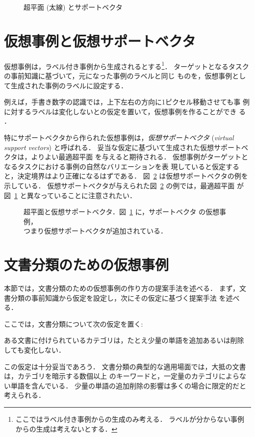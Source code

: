 \begin{figure}
\begin{center}
\end{center}
\caption{超平面 (太線) とサポートベクタ}\label{fig:sv}
\end{figure}


\section{仮想事例と仮想サポートベクタ}\label{sec:vsv}

仮想事例は，ラベル付き事例から生成されるとする\footnote{
ここではラベル付き事例からの生成のみ考える．
ラベルが分からない事例からの生成は考えないとする．
}．
ターゲットとなるタスクの事前知識に基づいて，元になった事例のラベルと同じ
ものを，仮想事例として生成された事例のラベルに設定する．


例えば，手書き数字の認識では，上下左右の方向に1ピクセル移動させても事
例に対するラベルは変化しないとの仮定を置いて，仮想事例を作ることができ
る \cite{Schoelkopf1996,DeCoste2002}．

特にサポートベクタから作られた仮想事例は，{\em 仮想サポートベクタ} 
({\em virtual support vectors}) と呼ばれる．
妥当な仮定に基づいて生成された仮想サポートベクタは，よりよい最適超平面
を与えると期待される．
仮想事例がターゲットとなるタスクにおける事例の自然なバリエーションを表
現していると仮定すると，決定境界はより正確になるはずである．
図~\ref{fig:vsv} は仮想サポートベクタの例を示している．
仮想サポートベクタが与えられた図~\ref{fig:vsv} の例では，最適超平面
が図~\ref{fig:sv} と異なっていることに注意されたい．

\begin{figure}
\begin{center}
\end{center}
\caption{超平面と仮想サポートベクタ．図~\ref{fig:sv} に，サポートベクタ
の仮想事例，\\
つまり仮想サポートベクタが追加されている．}\label{fig:vsv}
\end{figure}


\section{文書分類のための仮想事例}\label{sec:vx}
本節では，文書分類のための仮想事例の作り方の提案手法を述べる．
まず，文書分類の事前知識から仮定を設定し，次にその仮定に基づく提案手法
を述べる．

ここでは，文書分類について次の仮定を置く:
\begin{assumption}\label{assum1}
ある文書に付けられているカテゴリは，たとえ少量の単語を追加あるいは削除
しても変化しない．
\end{assumption}
この仮定は十分妥当であろう．
文書分類の典型的な適用場面では，大抵の文書は，カテゴリを暗示する数個以上
のキーワードと，一定量のカテゴリによらない単語を含んでいる．
少量の単語の追加削除の影響は多くの場合に限定的だと考えられる．

